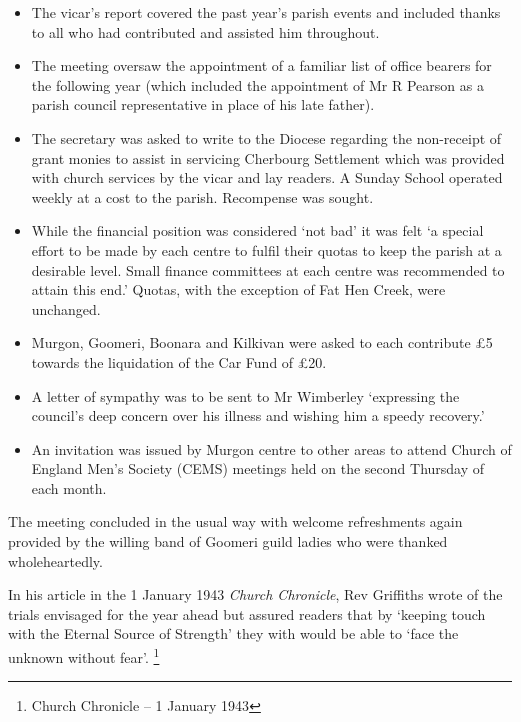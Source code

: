 \begin{itemize}
\item
  The vicar's report covered the past year's parish events and included thanks to all who had contributed and assisted him throughout.
\item
  The meeting oversaw the appointment of a familiar list of office bearers for the following year (which included the appointment of Mr R Pearson as a parish council representative in place of his late father).
\item
  The secretary was asked to write to the Diocese regarding the non-receipt of grant monies to assist in servicing Cherbourg Settlement which was provided with church services by the vicar and lay readers. A Sunday School operated weekly at a cost to the parish. Recompense was sought.
\item
  While the financial position was considered `not bad' it was felt `a special effort to be made by each centre to fulfil their quotas to keep the parish at a desirable level. Small finance committees at each centre was recommended to attain this end.' Quotas, with the exception of Fat Hen Creek, were unchanged.
\item
  Murgon, Goomeri, Boonara and Kilkivan were asked to each contribute £5 towards the liquidation of the Car Fund of £20.
\item
  A letter of sympathy was to be sent to Mr Wimberley `expressing the council's deep concern over his illness and wishing him a speedy recovery.'
\item
  An invitation was issued by Murgon centre to other areas to attend Church of England Men's Society (CEMS) meetings held on the second Thursday of each month.
\end{itemize}

The meeting concluded in the usual way with welcome refreshments again provided by the willing band of Goomeri guild ladies who were thanked wholeheartedly.

In his article in the 1 January 1943 \emph{Church Chronicle}, Rev Griffiths wrote of the trials envisaged for the year ahead but assured readers that by `keeping touch with the Eternal Source of Strength' they with would be able to `face the unknown without fear'. \footnote{Church Chronicle -- 1 January 1943}

